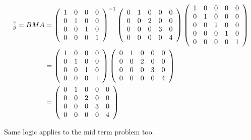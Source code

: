 \documentclass[11pt, cyan, night, 1in]{LatexTemplate/hw}
\begin{document}
{    \begin{align*}
        [T]_\be^\ga = BMA &=    \bra{
            \begin{array}
                {cccc}
                1 & 0 & 0 & 0\\
                0 & 1 & 0 & 0\\
                0 & 0 & 1 & 0\\
                0 & 0 & 0 & 1
            \end{array}
        }^{-1}\bra{
            \begin{array}
                {ccccc}
                0 & 1 & 0 & 0 & 0\\
                0 & 0 & 2 & 0 & 0\\
                0 & 0 & 0 & 3 & 0\\
                0 & 0 & 0 & 0 & 4
            \end{array}
        }\bra{
            \begin{array}
                {ccccc}
                1 & 0 & 0 & 0 & 0\\
                0 & 1 & 0 & 0 & 0\\
                0 & 0 & 1 & 0 & 0\\
                0 & 0 & 0 & 1 & 0\\
                0 & 0 & 0 & 0 & 1
            \end{array}
        }\\
        &=\bra{
            \begin{array}
                {cccc}
                1 & 0 & 0 & 0\\
                0 & 1 & 0 & 0\\
                0 & 0 & 1 & 0\\
                0 & 0 & 0 & 1
            \end{array}
        }\bra{
            \begin{array}
                {ccccc}
                0 & 1 & 0 & 0 & 0\\
                0 & 0 & 2 & 0 & 0\\
                0 & 0 & 0 & 3 & 0\\
                0 & 0 & 0 & 0 & 4
            \end{array}
        }\\
        &=\bra{
            \begin{array}
                {ccccc}
                0 & 1 & 0 & 0 & 0\\
                0 & 0 & 2 & 0 & 0\\
                0 & 0 & 0 & 3 & 0\\
                0 & 0 & 0 & 0 & 4
            \end{array}
        }
    \end{align*}

    Same logic applies to the mid term problem too.
}
\end{document}
